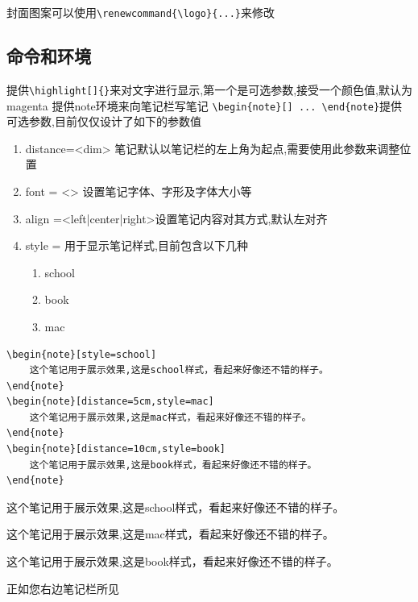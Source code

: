 \documentclass{memory}
\begin{document}
封面图案可以使用\verb|\renewcommand{\logo}{...}|来修改
\subsection{命令和环境}
提供\verb+\highlight[]{}+来对文字进行显示,第一个是可选参数,接受一个颜色值,默认为magenta
提供note环境来向笔记栏写笔记 \verb|\begin{note}[] ... \end{note}|提供可选参数,目前仅仅设计了如下的参数值
\begin{enumerate}
    \item distance=<dim> 笔记默认以笔记栏的左上角为起点,需要使用此参数来调整位置
    \item font = <> 设置笔记字体、字形及字体大小等
    \item align =<left|center|right>设置笔记内容对其方式,默认左对齐
    \item style = 用于显示笔记样式,目前包含以下几种
    \begin{enumerate}
        \item school
        \item book
        \item mac
    \end{enumerate}
\end{enumerate}
\begin{lstlisting}
\begin{note}[style=school]
    这个笔记用于展示效果,这是school样式，看起来好像还不错的样子。
\end{note}
\begin{note}[distance=5cm,style=mac]
    这个笔记用于展示效果,这是mac样式，看起来好像还不错的样子。
\end{note}
\begin{note}[distance=10cm,style=book]
    这个笔记用于展示效果,这是book样式，看起来好像还不错的样子。
\end{note}
\end{lstlisting}
\begin{note}[style=school]
    这个笔记用于展示效果,这是school样式，看起来好像还不错的样子。
\end{note}
\begin{note}[distance=5cm,style=mac]
    这个笔记用于展示效果,这是mac样式，看起来好像还不错的样子。
\end{note}
\begin{note}[distance=10cm,style=book]
    这个笔记用于展示效果,这是book样式，看起来好像还不错的样子。
\end{note}
正如您右边笔记栏所见
\end{document}
